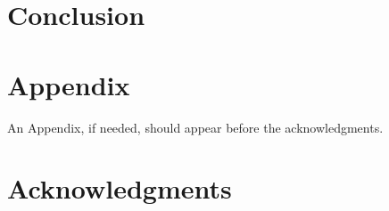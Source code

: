 \documentclass[conf]{new-aiaa}
\newcommand{\TexDir}{./attachments/tex/}
\begin{document}






\section{Conclusion}






\clearpage
\FloatBarrier
\section*{Appendix}

An Appendix, if needed, should appear before the acknowledgments.





\section*{Acknowledgments}


%
\end{document}
